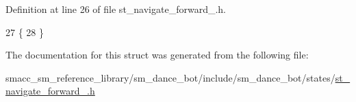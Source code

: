 Definition at line 26 of file st\+\_\+navigate\+\_\+forward\+\_.\+h.


\begin{DoxyCode}
27   \{
28   \}
\end{DoxyCode}


The documentation for this struct was generated from the following file\+:\begin{DoxyCompactItemize}
\item 
smacc\+\_\+sm\+\_\+reference\+\_\+library/sm\+\_\+dance\+\_\+bot/include/sm\+\_\+dance\+\_\+bot/states/\hyperlink{st__navigate__forward__2_8h}{st\+\_\+navigate\+\_\+forward\+\_.\+h}\end{DoxyCompactItemize}
